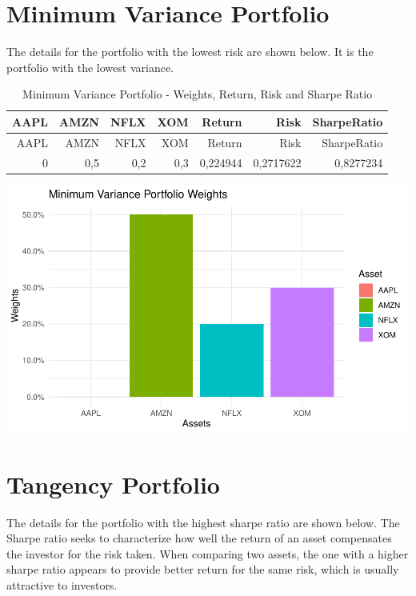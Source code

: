 \documentclass[
]{article}
\begin{document}
\newpage

\hypertarget{minimum-variance-portfolio}{%
\section{Minimum Variance Portfolio}\label{minimum-variance-portfolio}}

The details for the portfolio with the lowest risk are shown below. It
is the portfolio with the lowest variance.

\begin{longtable}[]{@{}rrrrrrr@{}}
\caption{Minimum Variance Portfolio - Weights, Return, Risk and Sharpe
Ratio}\tabularnewline
\toprule()
AAPL & AMZN & NFLX & XOM & Return & Risk & SharpeRatio \\
\midrule()
\endfirsthead
\toprule()
AAPL & AMZN & NFLX & XOM & Return & Risk & SharpeRatio \\
\midrule()
\endhead
0 & 0,5 & 0,2 & 0,3 & 0,224944 & 0,2717622 & 0,8277234 \\
\bottomrule()
\end{longtable}

\begin{center}\includegraphics{EfficientFrontier_files/figure-latex/plot Minimum Variance Portfolio-1} \end{center}

\newpage

\hypertarget{tangency-portfolio}{%
\section{Tangency Portfolio}\label{tangency-portfolio}}

The details for the portfolio with the highest sharpe ratio are shown
below. The Sharpe ratio seeks to characterize how well the return of an
asset compensates the investor for the risk taken. When comparing two
assets, the one with a higher sharpe ratio appears to provide better
return for the same risk, which is usually attractive to investors.
\end{document}
